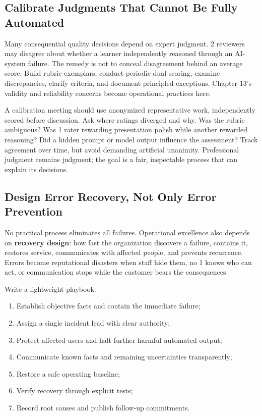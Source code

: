 \subsection{Calibrate Judgments That Cannot Be Fully Automated}
\label{sec:calibrate_expert_judgments}

Many consequential quality decisions depend on expert judgment. 2 reviewers may disagree about whether a learner independently reasoned through an AI-system failure. The remedy is not to conceal disagreement behind an average score. Build rubric exemplars, conduct periodic dual scoring, examine discrepancies, clarify criteria, and document principled exceptions. Chapter 13's validity and reliability concerns become operational practices here.

A calibration meeting should use anonymized representative work, independently scored before discussion. Ask where ratings diverged and why. Was the rubric ambiguous? Was 1 rater rewarding presentation polish while another rewarded reasoning? Did a hidden prompt or model output influence the assessment? Track agreement over time, but avoid demanding artificial unanimity. Professional judgment remains judgment; the goal is a fair, inspectable process that can explain its decisions.

\subsection{Design Error Recovery, Not Only Error Prevention}
\label{sec:error_recovery_design}

No practical process eliminates all failures. Operational excellence also depends on \textbf{recovery design}: how fast the organization discovers a failure, contains it, restores service, communicates with affected people, and prevents recurrence. Errors become reputational disasters when staff hide them, no 1 knows who can act, or communication stops while the customer bears the consequences.

Write a lightweight playbook:
\begin{enumerate}
    \item Establish objective facts and contain the immediate failure;
    \item Assign a single incident lead with clear authority;
    \item Protect affected users and halt further harmful automated output;
    \item Communicate known facts and remaining uncertainties transparently;
    \item Restore a safe operating baseline;
    \item Verify recovery through explicit tests;
    \item Record root causes and publish follow-up commitments.
\end{enumerate}

